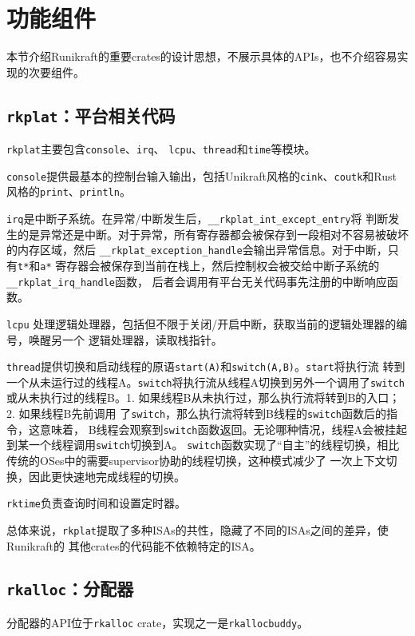\documentclass{../runikraft-report}
\begin{document}
\section{功能组件}
本节介绍Runikraft的重要crates的设计思想，不展示具体的APIs，也不介绍容易实现的次要组件。
\subsection[\texttt{rkplat}]{\texttt{rkplat}：平台相关代码}
\texttt{rkplat}主要包含\texttt{console}、\texttt{irq}、
\texttt{lcpu}、\texttt{thread}和\texttt{time}等模块。

\texttt{console}提供最基本的控制台输入输出，包括Unikraft风格的\texttt{cink}、\texttt{coutk}和Rust
风格的\texttt{print}、\texttt{println}。

\texttt{irq}是中断子系统。在异常/中断发生后，\texttt{\_\_rkplat\_int\_except\_entry}将
判断发生的是异常还是中断。对于异常，所有寄存器都会被保存到一段相对不容易被破坏的内存区域，然后
\texttt{\_\_rkplat\_exception\_handle}会输出异常信息。对于中断，只有\texttt{t*}和\texttt{a*}
寄存器会被保存到当前在栈上，然后控制权会被交给中断子系统的\texttt{\_\_rkplat\_irq\_handle}函数，
后者会调用有平台无关代码事先注册的中断响应函数。

\texttt{lcpu} 处理逻辑处理器，包括但不限于关闭/开启中断，获取当前的逻辑处理器的编号，唤醒另一个
逻辑处理器，读取栈指针。

\texttt{thread}提供切换和启动线程的原语\texttt{start(A)}和\texttt{switch(A,B)}。\texttt{start}将执行流
转到一个从未运行过的线程A。\texttt{switch}将执行流从线程A切换到另外一个调用了\texttt{switch}
或从未执行过的线程B。1. 如果线程B从未执行过，那么执行流将转到B的入口；2. 如果线程B先前调用
了\texttt{switch}，那么执行流将转到B线程的\texttt{switch}函数后的指令，这意味着，
B线程会观察到\texttt{switch}函数返回。无论哪种情况，线程A会被挂起到某一个线程调用\texttt{switch}切换到A。
\texttt{switch}函数实现了“自主”的线程切换，相比传统的OSes中的需要supervisor协助的线程切换，这种模式减少了
一次上下文切换，因此更快速地完成线程的切换。%

\texttt{rktime}负责查询时间和设置定时器。

总体来说，\texttt{rkplat}提取了多种ISAs的共性，隐藏了不同的ISAs之间的差异，使 Runikraft的
其他crates的代码能不依赖特定的ISA。
\subsection[\texttt{rkalloc}]{\texttt{rkalloc}：分配器}
分配器的API位于\texttt{rkalloc} crate，实现之一是\texttt{rkallocbuddy}。
\end{document}
